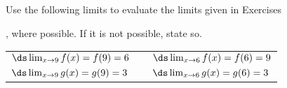 {\noindent Use the following limits to evaluate the limits given in Exercises}
{, where possible. If it is not possible, state so.

\begin{tabular}{lll}
$\ds \lim_{x\to9}f(x) = f(9) = 6$ & \quad\quad &$\ds \lim_{x\to6} f(x) = f(6) = 9$\\
$\ds \lim_{x\to9}g(x) = g(9) = 3$ &  & $\ds \lim_{x\to6} g(x) = g(6) = 3$
\end{tabular}}
